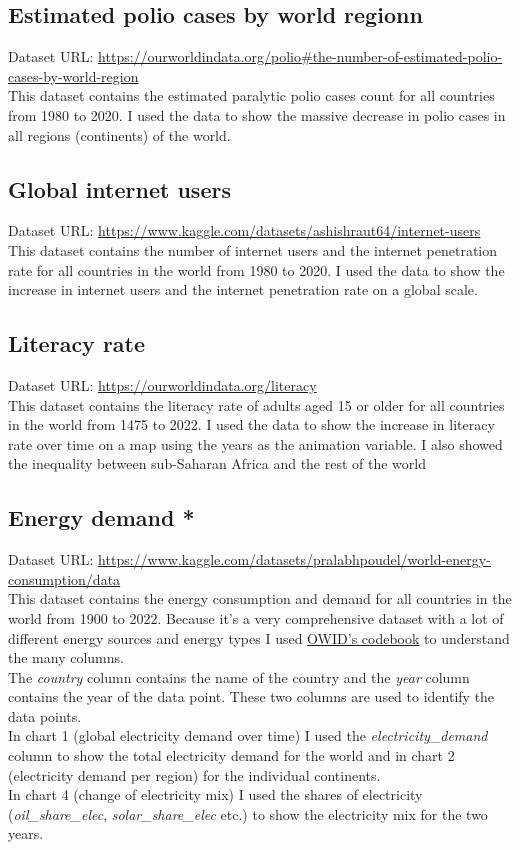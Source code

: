 \documentclass{article}
\begin{document}
\subsection{Estimated polio cases by world regionn}
Dataset URL: \url{https://ourworldindata.org/polio#the-number-of-estimated-polio-cases-by-world-region} \\
This dataset contains the estimated paralytic polio cases count for all countries from 1980 to 2020.
I used the data to show the massive decrease in polio cases in all regions (continents) of the world.

\subsection{Global internet users}
Dataset URL: \url{https://www.kaggle.com/datasets/ashishraut64/internet-users} \\
This dataset contains the number of internet users and the internet penetration rate for all countries in the world from 1980 to 2020.
I used the data to show the increase in internet users and the internet penetration rate on a global scale.

\subsection{Literacy rate}
Dataset URL: \url{https://ourworldindata.org/literacy} \\
This dataset contains the literacy rate of adults aged 15 or older for all countries in the world from 1475 to 2022.
I used the data to show the increase in literacy rate over time on a map using the years as the animation variable.
I also showed the inequality between sub-Saharan Africa and the rest of the world

\subsection{Energy demand *}
Dataset URL: \url{https://www.kaggle.com/datasets/pralabhpoudel/world-energy-consumption/data} \\
This dataset contains the energy consumption and demand for all countries in the world from 1900 to 2022.
Because it's a very comprehensive dataset with a lot of different energy sources and energy types I used \href{https://github.com/owid/energy-data/blob/master/owid-energy-codebook.csv}{OWID's codebook} to understand the many columns. \\
The \textit{country} column contains the name of the country and the \textit{year} column contains the year of the data point. These two columns are used to identify the data points. \\
In chart 1 (global electricity demand over time) I used the \textit{electricity\_demand} column to show the total electricity demand for the world and in chart 2 (electricity demand per region) for the individual continents. \\
In chart 4 (change of electricity mix) I used the shares of electricity (\textit{oil\_share\_elec}, \textit{solar\_share\_elec} etc.) to show the electricity mix for the two years. \\
\end{document}
